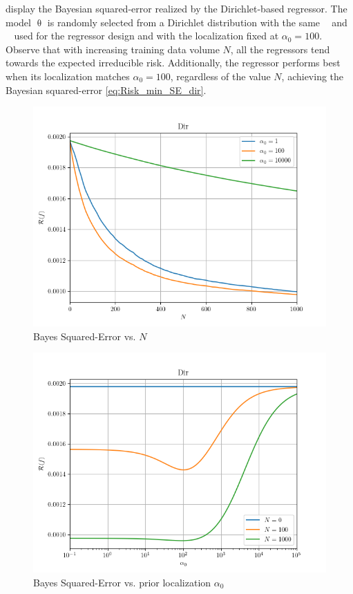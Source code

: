 \documentclass[12pt]{report}
\DeclareMathOperator{\alpham}{\alpha_\text{m}}
\DeclareMathOperator{\alphac}{\alpha_\text{c}}
\begin{document}
 display the Bayesian squared-error realized by the Dirichlet-based regressor. The model $\uptheta$ is randomly selected from a Dirichlet distribution with the same $\alpham$ and $\alphac$ used for the regressor design and with the localization fixed at $\alpha_0 = 100$. Observe that with increasing training data volume $N$, all the regressors tend towards the expected irreducible risk. Additionally, the regressor performs best when its localization matches $\alpha_0 = 100$, regardless of the value $N$, achieving the Bayesian squared-error \eqref{eq:Risk_min_SE_dir}.
\begin{figure}
\centering
\includegraphics[width=0.8\linewidth]{SSP_2021/Risk_SE_N.png}
\caption{Bayes Squared-Error vs. $N$}
\label{fig:SSP_2021/Risk_SE_N}
\end{figure}
\begin{figure}
\centering
\includegraphics[width=0.8\linewidth]{SSP_2021/Risk_SE_a0.png}
\caption{Bayes Squared-Error vs. prior localization $\alpha_0$}
\label{fig:SSP_2021/Risk_SE_a0}
\end{figure}
\end{document}
